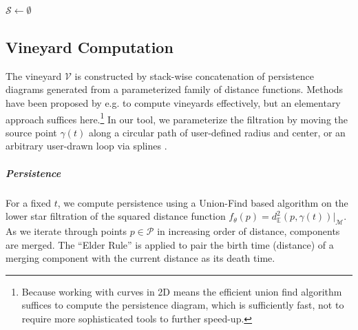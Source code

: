 \documentclass[a4paper,english,numberwithinsect]{eurocg26}
\newcommand{\M}{\mathcal{M}}
\begin{document}
\begin{algorithm}[t]
\caption{Discrete Symmetry Set Computation}
\label{alg:symmetry_set}
\DontPrintSemicolon
{}

$\mathcal{S} \gets \emptyset$\;
\end{algorithm}

\subsection{Vineyard Computation}

The vineyard $\mathcal{V}$ is constructed by stack-wise concatenation of persistence diagrams generated from a parameterized family of distance functions. Methods have been proposed by e.g. \cite{tamalrevisit} to compute vineyards effectively, but an elementary approach suffices here.\footnote{Because working with curves in 2D means the efficient union find algorithm suffices to compute the persistence diagram, which is sufficiently fast, not to require more sophisticated tools to further speed-up.} %
In our tool, we parameterize the filtration by moving the source point $\gamma(t)$ along a circular path of user-defined radius and center, or an arbitrary user-drawn loop via splines \cite{deBoor1978}.

\subparagraph{Persistence}
For a fixed $t$, we compute persistence using a Union-Find based algorithm on the lower star filtration of the squared distance function $f_\theta(p) = d_{\mathbb{E}}^2(p,\gamma(t))|_\M$. As we iterate through points $p \in \mathcal{P}$ in increasing order of distance, components are merged. The ``Elder Rule'' is applied to pair the birth time (distance) of a merging component with the current distance as its death time.
\end{document}
